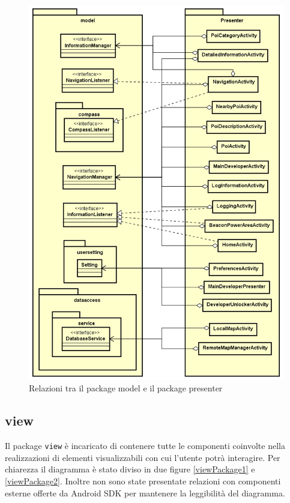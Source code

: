 \documentclass[../DefinizioneDiProdotto.tex,lanscape]{subfiles}
\begin{document}
\begin{figure}[p]
	\centering
	\includegraphics[width=\textwidth, keepaspectratio]{img/RelationPackage/presenter-model}
	\caption{Relazioni tra il package model e il package presenter}
	\label{presenter-model}
\end{figure}


\newpage
	\subsection{view}
		Il package \verb|view| è incaricato di contenere tutte le componenti coinvolte nella realizzazioni di elementi visualizzabili con cui l'utente potrà interagire. Per chiarezza il diagramma è stato diviso in due figure \ref{viewPackage1} e \ref{viewPackage2}. Inoltre non sono state presentate relazioni con componenti esterne offerte da Android SDK per mantenere la leggibilità del diagramma.
\end{document}
